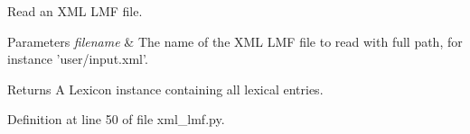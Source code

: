Read an X\+M\+L L\+M\+F file. 


\begin{DoxyParams}{Parameters}
{\em filename} & The name of the X\+M\+L L\+M\+F file to read with full path, for instance 'user/input.\+xml'. \\
\hline
\end{DoxyParams}
\begin{DoxyReturn}{Returns}
A Lexicon instance containing all lexical entries. 
\end{DoxyReturn}


Definition at line 50 of file xml\+\_\+lmf.\+py.

